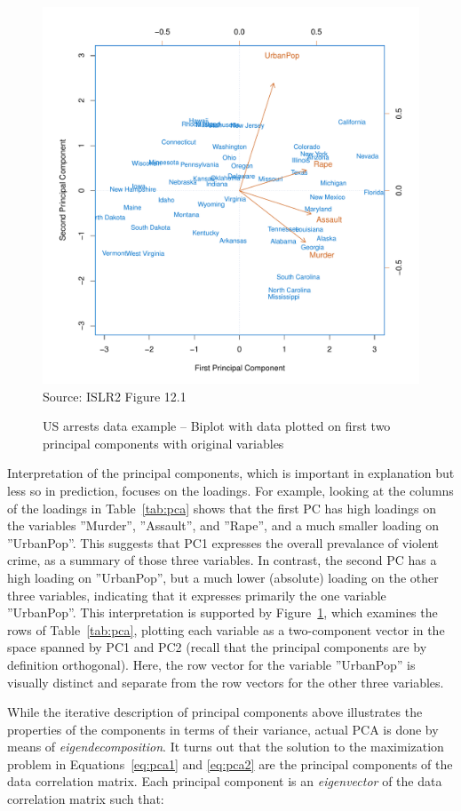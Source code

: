 \begin{figure}
\centering
\includegraphics[width=.75\textwidth]{../class11/Figures_Chapters_7-13/Chapter12/12_1.pdf} \\

\scriptsize Source: ISLR2 Figure 12.1
\caption[US arrests data example -- Biplot]{US arrests data example -- Biplot with data plotted on first two principal components with original variables}
\label{fig:pca2}
\end{figure}

Interpretation of the principal components, which is important in explanation but less so in prediction, focuses on the loadings. For example, looking at the columns of the loadings in Table~\ref{tab:pca} shows that the first PC has high loadings on the variables ''Murder'', ''Assault'', and ''Rape'', and a much smaller loading on ''UrbanPop''. This suggests that PC1 expresses the overall prevalance of violent crime, as a summary of those three variables. In contrast, the second PC has a high loading on ''UrbanPop'', but a much lower (absolute) loading on the other three variables, indicating that it expresses primarily the one variable ''UrbanPop''. This interpretation is supported by Figure~\ref{fig:pca2}, which examines the rows of Table~\ref{tab:pca}, plotting each variable as a two-component vector in the space spanned by PC1 and PC2 (recall that the principal components are by definition orthogonal). Here, the row vector for the variable ''UrbanPop'' is visually distinct and separate from the row vectors for the other three variables. 

While the iterative description of principal components above illustrates the properties of the components in terms of their variance, actual PCA is done by means of \emph{eigendecomposition}. It turns out that the solution to the maximization problem in Equations~\ref{eq:pca1} and \ref{eq:pca2} are the principal components of the data correlation matrix. Each principal component is an \emph{eigenvector} of the data correlation matrix such that:

